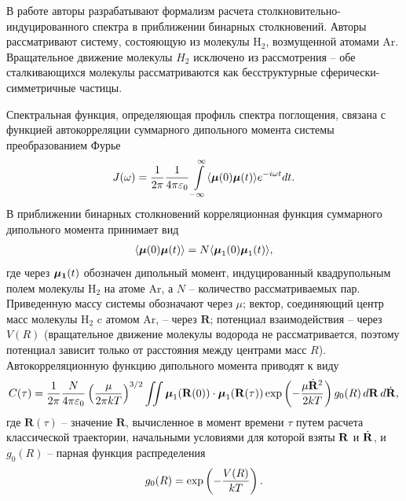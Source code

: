 В работе \cite{kranendonk1973} авторы разрабатывают формализм расчета столкновительно-индуци\-рован\-ного спектра в приближении бинарных столкновений. Авторы рассматривают систему, состояющую из молекулы H$_2$, возмущенной атомами Ar. Вращательное движение молекулы $H_2$ исключено из рассмотрения -- обе сталкивающихся молекулы рассматриваются как бесструктурные сферически-симметричные частицы. \par
    Спектральная функция, определяющая профиль спектра поглощения, связана с функцией автокорреляции суммарного дипольного момента системы преобразованием Фурье
\begin{gather}
    J(\omega) = \frac{1}{2\pi} \frac{1}{4 \pi \varepsilon_0} \int\limits_{-\infty}^\infty \langle  \boldsymbol{\mu}(0) \boldsymbol{\mu}(t)  \rangle e^{-i \omega t} dt. \label{twoatom-spectral-function}
\end{gather} 
В приближении бинарных столкновений корреляционная функция суммарного дипольного момента принимает вид 
\begin{gather}
    \langle  \boldsymbol{\mu}(0) \boldsymbol{\mu}(t)  \rangle = N \langle  \boldsymbol{\mu}_1(0) \boldsymbol{\mu}_1(t)  \rangle,
\end{gather} 
%
где через $\boldsymbol{\mu_1}(t)$ обозначен дипольный момент, индуцированный квадрупольным полем молекулы H$_2$ на атоме Ar, а $N$ -- количество рассматриваемых пар. Приведенную массу системы обозначают через $\mu$; вектор, соединяющий центр масс молекулы H$_2$ c атомом Ar, -- через $\mathbf{R}$; потенциал взаимодействия -- через $V(R)$ (вращательное движение молекулы водорода не рассматривается, поэтому потенциал зависит только от расстояния между центрами масс $R$). Автокорреляционную функцию дипольного момента приводят к виду 
\begin{gather}
    C(\tau) = \frac{1}{2 \pi} \frac{N}{4 \pi \varepsilon_0} \left( \frac{\mu}{2 \pi k T} \right)^{3/2} \iint \boldsymbol{\mu}_1(\mathbf{R}(0)) \cdot \boldsymbol{\mu}_1(\mathbf{R}(\tau)) \exp \left( -\frac{\mu \dot{\mathbf{R}}^2}{2 k T} \right) g_0(R) \, d \mathbf{R} \, d \dot{\mathbf{R}}, \label{kranendonk-correlation-function}
\end{gather}
%
где $\mathbf{R}(\tau)$ -- значение $\mathbf{R}$, вычисленное в момент времени $\tau$ путем расчета классической траектории, начальными условиями для которой взяты $\mathbf{R}$ и $\dot{\mathbf{R}}$, и $g_0(R)$ -- парная функция распределения 
\begin{gather}
    g_0(R) = \exp \left( -\frac{V(R)}{kT} \right).
\end{gather}

